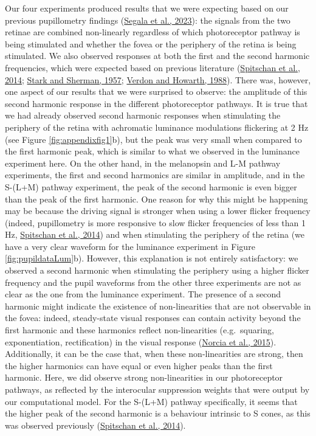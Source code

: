 \documentclass[
]{article}
\begin{document}
Our four experiments produced results that we were expecting based on our previous pupillometry findings (\protect\hyperlink{ref-Segala2023}{Segala et al., 2023}): the signals from the two retinae are combined non-linearly regardless of which photoreceptor pathway is being stimulated and whether the fovea or the periphery of the retina is being stimulated. We also observed responses at both the first and the second harmonic frequencies, which were expected based on previous literature (\protect\hyperlink{ref-Spitschan2014}{Spitschan et al., 2014}; \protect\hyperlink{ref-Stark1957}{Stark and Sherman, 1957}; \protect\hyperlink{ref-Verdon1988}{Verdon and Howarth, 1988}). There was, however, one aspect of our results that we were surprised to observe: the amplitude of this second harmonic response in the different photoreceptor pathways. It is true that we had already observed second harmonic responses when stimulating the periphery of the retina with achromatic luminance modulations flickering at 2 Hz (see Figure \ref{fig:appendixfig1}b), but the peak was very small when compared to the first harmonic peak, which is similar to what we observed in the luminance experiment here. On the other hand, in the melanopsin and L-M pathway experiments, the first and second harmonics are similar in amplitude, and in the S-(L+M) pathway experiment, the peak of the second harmonic is even bigger than the peak of the first harmonic. One reason for why this might be happening may be because the driving signal is stronger when using a lower flicker frequency (indeed, pupillometry is more responsive to slow flicker frequencies of less than 1 Hz, \protect\hyperlink{ref-Spitschan2014}{Spitschan et al., 2014}) and when stimulating the periphery of the retina (we have a very clear waveform for the luminance experiment in Figure \ref{fig:pupildataLum}b). However, this explanation is not entirely satisfactory: we observed a second harmonic when stimulating the periphery using a higher flicker frequency and the pupil waveforms from the other three experiments are not as clear as the one from the luminance experiment. The presence of a second harmonic might indicate the existence of non-linearities that are not observable in the fovea: indeed, steady-state visual responses can contain activity beyond the first harmonic and these harmonics reflect non-linearities (e.g.~squaring, exponentiation, rectification) in the visual response (\protect\hyperlink{ref-Norcia2015}{Norcia et al., 2015}). Additionally, it can be the case that, when these non-linearities are strong, then the higher harmonics can have equal or even higher peaks than the first harmonic. Here, we did observe strong non-linearities in our photoreceptor pathways, as reflected by the interocular suppression weights that were output by our computational model. For the S-(L+M) pathway specifically, it seems that the higher peak of the second harmonic is a behaviour intrinsic to S cones, as this was observed previously (\protect\hyperlink{ref-Spitschan2014}{Spitschan et al., 2014}).
\end{document}

